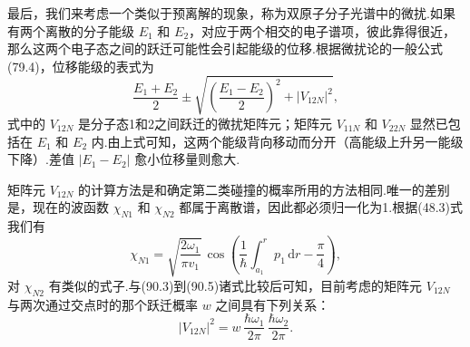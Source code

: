 最后，我们来考虑一个类似于预离解的现象，称为双原子分子光谱中的微扰.如果有两个离散的分子能级 $E_1$ 和 $E_2$，对应于两个相交的电子谱项，彼此靠得很近，那么这两个电子态之间的跃迁可能性会引起能级的位移.根据微扰论的一般公式(79.4)，位移能级的表式为
\begin{equation}
  \frac{E_1+E_2}{2}\pm
  \sqrt{\left(\frac{E_1-E_2}{2}\right)^2+|V_{12N}|^2},
\end{equation}
式中的 $V_{12N}$ 是分子态1和2之间跃迁的微扰矩阵元；矩阵元 $V_{11N}$ 和 $V_{22N}$ 显然已包括在 $E_1$ 和 $E_2$ 内.由上式可知，这两个能级背向移动而分开（高能级上升另一能级下降）.差值 $|E_1-E_2|$ 愈小位移量则愈大.

矩阵元 $V_{12N}$ 的计算方法是和确定第二类碰撞的概率所用的方法相同.唯一的差别是，现在的波函数 $\chi_{N1}$ 和 $\chi_{N2}$ 都属于离散谱，因此都必须归一化为1.根据(48.3)式我们有
\begin{equation*}
  \chi_{N1}=\sqrt{\frac{2\omega_1}{\pi v_1}}\,
  \cos\left(\frac{1}{\hbar}\int_{a_1}^r p_1\,\mathrm{d}r-\frac{\pi}{4}\right),
\end{equation*}
对 $\chi_{N2}$ 有类似的式子.与(90.3)到(90.5)诸式比较后可知，目前考虑的矩阵元 $V_{12N}$ 与两次通过交点时的那个跃迁概率 $w$ 之间具有下列关系：
\begin{equation}
  |V_{12N}|^2=w\,\frac{\hbar\omega_1}{2\pi}\,\frac{\hbar\omega_2}{2\pi}.
\end{equation}

